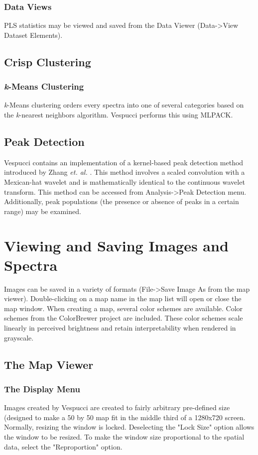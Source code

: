 \documentclass[12pt]{achemso} %
\begin{document}
\subsubsection{Data Views} PLS statistics may be viewed and saved from the Data
Viewer (Data->View Dataset Elements).

\subsection{Crisp Clustering}

\subsubsection{\emph{k}-Means Clustering} \emph{k}-Means clustering orders every
spectra into one of several categories based on the \emph{k}-nearest neighbors
algorithm. Vespucci performs this using MLPACK.

\subsection{Peak Detection}
Vespucci contains an implementation of a kernel-based peak detection method introduced by 
Zhang \emph{et. al.} \cite{Zhang2010}. This method involves a scaled convolution with a Mexican-hat
 wavelet and is mathematically identical to the continuous wavelet transform. This method can be accessed 
from Analysis->Peak Detection menu. Additionally, peak populations (the presence or absence of peaks in a certain range) 
may be examined.

\newpage 
\section{Viewing and Saving Images and Spectra} 
Images can be saved in a variety of formats (File->Save Image As from
the map viewer). Double-clicking on a map name in the map list will open or
close the map window. When creating a map, several color schemes are available.
Color schemes from the ColorBrewer project \cite{ColorBrewer} are included. These
color schemes scale linearly in perceived brightness and retain interpretability when 
rendered in grayscale.

\subsection{The Map Viewer} 
\subsubsection{The Display Menu} 
Images created by Vespucci are created to fairly arbitrary pre-defined
size (designed to make a 50 by 50 map fit in the middle third of a 1280x720
screen. Normally, resizing the window is locked. Deselecting the "Lock Size"
option allows the window to be resized. To make the window size proportional to
the spatial data, select the "Reproportion" option.
\end{document}
